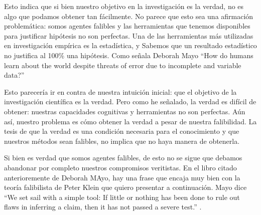 \documentclass{article}
\begin{document}
Esto indica que si bien nuestro objetivo en la investigación es la verdad, no es algo que podamos obtener tan fácilmente. No parece que esto sea una afirmación problemática: somos agentes falibles y las herramientas que tenemos disponibles para justificar hipótesis no son perfectas. Una de las herramientas más utilizadas en investigación empírica es la estadística, y Sabemos que un resultado estadístico no justifica al 100\% una hipótesis. Como señala Deborah Mayo ``How do humans learn about the world despite threats of error due to incomplete and variable data?'' \cite[p.~ xi]{Mayo2018} 

Esto parecería ir en contra de nuestra intuición inicial: que el objetivo de la investigación científica es la verdad. Pero como he señalado, la verdad es difícil de obtener: nuestras capacidades cognitivas y herramientas no son perfectas. Aún así, nuestro problema es cómo obtener la verdad a pesar de nuestra falibilidad. La tesis de que la verdad es una condición necesaria para el conocimiento y que nuestros métodos sean falibles, no implica que no haya manera de obtenerla.

Si bien es verdad que somos agentes falibles, de esto no se sigue que debamos abandonar por completo nuestros compromisos veritistas. En el libro citado anterioremente de Deborah MAyo, hay una frase que encaja muy bien con la teoría falibilista de Peter Klein que quiero presentar a continuación. Mayo dice ``We set sail with a simple tool: If little or nothing has been done to rule out flaws in inferring a claim, then it has not passed a severe test.'' \cite[p.~xii]{Mayo2018}.
\end{document}
